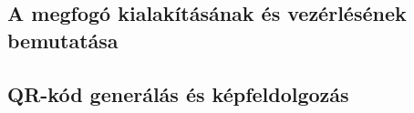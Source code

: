 \documentclass[../documentation.tex]{subfiles}
\begin{document}
\subsection{A megfogó kialakításának és vezérlésének bemutatása}

\subsection{QR-kód generálás és képfeldolgozás}
\end{document}
